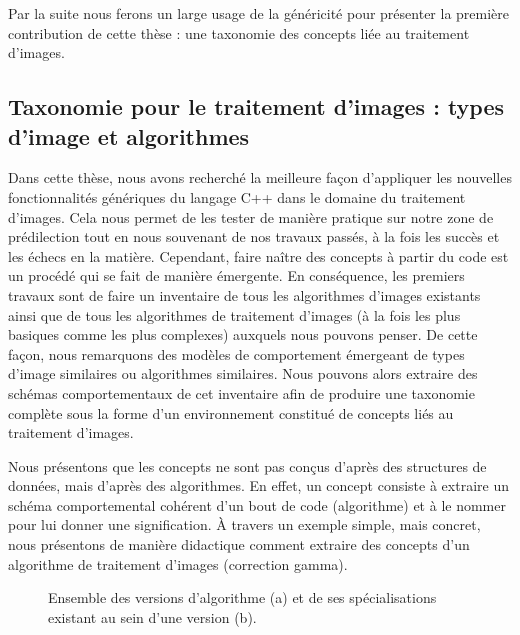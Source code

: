 Par la suite nous ferons un large usage de la généricité pour présenter la première contribution de cette thèse : une
taxonomie des concepts liée au traitement d'images.


\subsection*{Taxonomie pour le traitement d'images : types d'image et algorithmes}


Dans cette thèse, nous avons recherché la meilleure façon d'appliquer les nouvelles fonctionnalités génériques du
langage C++ dans le domaine du traitement d'images. Cela nous permet de les tester de manière pratique sur notre zone de
prédilection tout en nous souvenant de nos travaux passés, à la fois les succès et les échecs en la matière. Cependant,
faire naître des concepts à partir du code est un procédé qui se fait de manière émergente. En conséquence, les premiers
travaux sont de faire un inventaire de tous les algorithmes d'images existants ainsi que de tous les algorithmes de
traitement d'images (à la fois les plus basiques comme les plus complexes) auxquels nous pouvons penser. De cette façon,
nous remarquons des modèles de comportement émergeant de types d'image similaires ou algorithmes similaires. Nous
pouvons alors extraire des schémas comportementaux de cet inventaire afin de produire une taxonomie complète sous la
forme d'un environnement constitué de concepts liés au traitement d'images.

Nous présentons que les concepts ne sont pas conçus d'après des structures de données, mais d'après des algorithmes. En
effet, un concept consiste à extraire un schéma comportemental cohérent d'un bout de code (algorithme) et à le nommer
pour lui donner une signification. \`{A} travers un exemple simple, mais concret, nous présentons de manière didactique
comment extraire des concepts d'un algorithme de traitement d'images (correction gamma).

\begin{figure}[htbp]
  \centering
  \hfil
  \caption[]{Ensemble des versions d'algorithme (a) et de ses spécialisations existant au sein d'une version (b).}
  \label{resume:fig:image.version.vs.specialization}
\end{figure}

